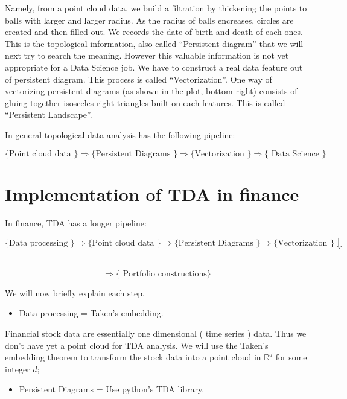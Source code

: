\documentclass[11pt]{article}
\providecommand{\tightlist}{%
      \setlength{\itemsep}{0pt}\setlength{\parskip}{0pt}}
\begin{document}
Namely, from a point cloud data, we build a filtration by thickening the
points to balls with larger and larger radius. As the radius of balls
encreases, circles are created and then filled out. We records the date
of birth and death of each ones. This is the topological information,
also called ``Persistent diagram'' that we will next try to search the
meaning. However this valuable information is not yet appropriate for a
Data Science job. We have to construct a real data feature out of
persistent diagram. This process is called ``Vectorization''. One way of
vectorizing persistent diagrams (as shown in the plot, bottom right)
consists of gluing together isosceles right triangles built on each
features. This is called ``Persistent Landscape''.

In general topological data analysis has the following pipeline:

\[ \{ \text{Point cloud data }\} \Longrightarrow  \{ \text{Persistent Diagrams }\}  \Longrightarrow  \{ \text{Vectorization }\}  \Longrightarrow  \{ \text{ Data Science }\}\]

    \hypertarget{implementation-of-tda-in-finance}{%
\section{Implementation of TDA in
finance}\label{implementation-of-tda-in-finance}}

In finance, TDA has a longer pipeline:

\[ \{ \text{Data processing }\} \Longrightarrow  \{ \text{Point cloud data }\} \Longrightarrow  \{ \text{Persistent Diagrams }\}  \Longrightarrow  \{ \text{Vectorization }\}   \Downarrow \]

\ \ \ \ \ \ \ \ \ \ \ \  \ \ \ \ \ \ \ \ \ \ \ \   \ \ \ \ \ \ \ \ \ \ \ \  \[ \Longrightarrow  \{ \text{ Portfolio constructions}\}\]


We will now briefly explain each step.

\begin{itemize}
\tightlist
\item
  Data processing = Taken's embedding.
\end{itemize}

Financial stock data are essentially one dimensional ( time series )
data. Thus we don't have yet a point cloud for TDA analysis. We will use
the Taken's embedding theorem to transform the stock data into a point
cloud in \(\mathbb{R}^{d}\) for some integer \(d;\)

\begin{itemize}
\tightlist
\item
  Persistent Diagrams = Use python's TDA library.
\end{itemize}
\end{document}
